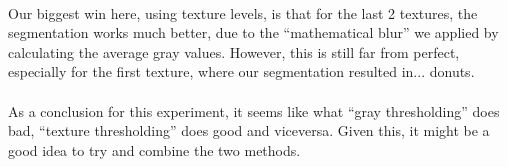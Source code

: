 \paragraph{}
Our biggest win here, using texture levels, is that for the last 2 textures, the segmentation works much better, due to the ``mathematical blur'' we applied by calculating the average gray values.
However, this is still far from perfect, especially for the first texture, where our segmentation resulted in... donuts.
\paragraph{}
As a conclusion for this experiment, it seems like what ``gray thresholding'' does bad, ``texture thresholding'' does good and viceversa.
Given this, it might be a good idea to try and combine the two methods.